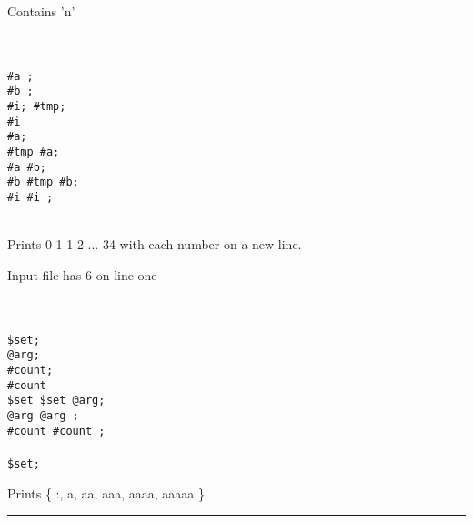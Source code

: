 \documentclass[11pt]{article}
\begin{document}
\begin{multicols}{2}

Contains 'n'

\begin{texto}
    \texttt{\\
		\BEGIN \\
		\tab \LET \#a ; \\
		\tab \LET \#b ; \\
		\tab \LET \#i; \LET \#tmp; \\ \vspace{0.25cm}
		\tab \FOR \#i \LT \OC \DO \\
		\tab \tab \PRINT \#a; \\
		\tab \tab \#tmp \ASS \#a; \\
		\tab \tab \#a \ASS \#b; \\
		\tab \tab \#b \ASS \#tmp \PLUS \#b; \\
		\tab \tab \#i \ASS \#i ; \\
		\tab \DONE \\
		\END
	 }
\end{texto}

Prints 0 1 1 2 ... 34 with each number on a new line.


\columnbreak

Input file has 6 on line one
\begin{texto}
    \texttt{\\
		\BEGIN \\
		\tab \LET \$set; \\
		\tab \LET @arg; \\ 
		\tab \LET \#count; \\ \vspace{0.25cm}
		\tab \FOR \#count \LT \OC \DO \\
		\tab \tab \$set \ASS \$set \ADD @arg; \\
		\tab \tab @arg \ASS @arg \CAT {}; \\
		\tab \tab \#count \ASS \#count ; \\
		\tab \DONE \\
		\tab \PRINT \$set; \\
		\END
	 }
\end{texto}

Prints \{ :, a, aa, aaa, aaaa, aaaaa \}

\end{multicols}
\begin{center}
\noindent\rule{8cm}{0.4pt}
\end{center}
\end{document}
